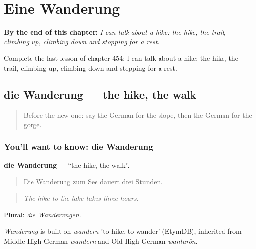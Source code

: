 
\chapter{Eine Wanderung}
\label{ch:ge-eine-wanderung}

\begin{chapteropening}
\textbf{By the end of this chapter:} \emph{I can talk about a hike: the hike, the trail, climbing up, climbing down and stopping for a rest.}

Complete the last lesson of chapter 454: I can talk about a hike: the hike, the trail, climbing up, climbing down and stopping for a rest.
\end{chapteropening}

\section[die Wanderung]{die Wanderung — the hike, the walk}

\label{lesson:GE-C454-wanderung}



\begin{quote}
Before the new one: say the German for the slope, then the German for the gorge.
\end{quote}

\subsection*{You'll want to know: die Wanderung}
\textbf{die Wanderung} — \textquotedblleft{}the hike, the walk\textquotedblright{}.

\begin{quote}
Die Wanderung zum See dauert drei Stunden.
\end{quote}

\begin{quote}
\emph{The hike to the lake takes three hours.}
\end{quote}

Plural: \emph{die Wanderungen}.

\begin{cousinweb}
\emph{Wanderung} is built on \emph{wandern} 'to hike, to wander' (EtymDB), inherited from Middle High German \emph{wandern} and Old High German \emph{wantarōn}.
\end{cousinweb}

